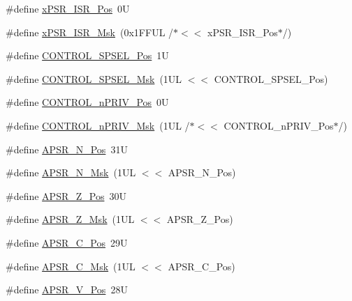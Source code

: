 \begin{DoxyCompactItemize}
\item 
\#define \mbox{\hyperlink{group___c_m_s_i_s___c_o_r_e_ga21bff245fb1aef9683f693d9d7bb2233}{x\+P\+S\+R\+\_\+\+I\+S\+R\+\_\+\+Pos}}~0U
\item 
\#define \mbox{\hyperlink{group___c_m_s_i_s___c_o_r_e_gadf8eed87e0081dfe1ef1c78a0ea91afd}{x\+P\+S\+R\+\_\+\+I\+S\+R\+\_\+\+Msk}}~(0x1\+F\+F\+U\+L /$\ast$$<$$<$ x\+P\+S\+R\+\_\+\+I\+S\+R\+\_\+\+Pos$\ast$/)
\item 
\#define \mbox{\hyperlink{group___c_m_s_i_s___c_o_r_e_ga07eafc53e609895342c6a530e9d01310}{C\+O\+N\+T\+R\+O\+L\+\_\+\+S\+P\+S\+E\+L\+\_\+\+Pos}}~1U
\item 
\#define \mbox{\hyperlink{group___c_m_s_i_s___c_o_r_e_ga70b29840969b06909da21369b0b05b53}{C\+O\+N\+T\+R\+O\+L\+\_\+\+S\+P\+S\+E\+L\+\_\+\+Msk}}~(1\+U\+L $<$$<$ C\+O\+N\+T\+R\+O\+L\+\_\+\+S\+P\+S\+E\+L\+\_\+\+Pos)
\item 
\#define \mbox{\hyperlink{group___c_m_s_i_s___c_o_r_e_ga51b95bc03ec0d815b459bde0b14a5908}{C\+O\+N\+T\+R\+O\+L\+\_\+n\+P\+R\+I\+V\+\_\+\+Pos}}~0U
\item 
\#define \mbox{\hyperlink{group___c_m_s_i_s___c_o_r_e_gaef3b20d77acb213338f89ce5e7bc36b0}{C\+O\+N\+T\+R\+O\+L\+\_\+n\+P\+R\+I\+V\+\_\+\+Msk}}~(1\+U\+L /$\ast$$<$$<$ C\+O\+N\+T\+R\+O\+L\+\_\+n\+P\+R\+I\+V\+\_\+\+Pos$\ast$/)
\item 
\#define \mbox{\hyperlink{group___c_m_s_i_s___c_o_r_e_gac469528d210043c7bd3f12f0e6824766}{A\+P\+S\+R\+\_\+\+N\+\_\+\+Pos}}~31U
\item 
\#define \mbox{\hyperlink{group___c_m_s_i_s___c_o_r_e_gadbc2cf55a026f661b53fadfcf822cef1}{A\+P\+S\+R\+\_\+\+N\+\_\+\+Msk}}~(1\+U\+L $<$$<$ A\+P\+S\+R\+\_\+\+N\+\_\+\+Pos)
\item 
\#define \mbox{\hyperlink{group___c_m_s_i_s___c_o_r_e_ga3661286d108b1aca308d7445685eae3a}{A\+P\+S\+R\+\_\+\+Z\+\_\+\+Pos}}~30U
\item 
\#define \mbox{\hyperlink{group___c_m_s_i_s___c_o_r_e_ga1deb4d1aa72bb83d1f79329406f15711}{A\+P\+S\+R\+\_\+\+Z\+\_\+\+Msk}}~(1\+U\+L $<$$<$ A\+P\+S\+R\+\_\+\+Z\+\_\+\+Pos)
\item 
\#define \mbox{\hyperlink{group___c_m_s_i_s___c_o_r_e_ga6cf72aa6f09a168f9e5beda1a4a887b9}{A\+P\+S\+R\+\_\+\+C\+\_\+\+Pos}}~29U
\item 
\#define \mbox{\hyperlink{group___c_m_s_i_s___c_o_r_e_ga6d47803fbad455bc10bd1ce59f2f335d}{A\+P\+S\+R\+\_\+\+C\+\_\+\+Msk}}~(1\+U\+L $<$$<$ A\+P\+S\+R\+\_\+\+C\+\_\+\+Pos)
\item 
\#define \mbox{\hyperlink{group___c_m_s_i_s___c_o_r_e_gac62830f67679ccd11658c4172c3e6ea7}{A\+P\+S\+R\+\_\+\+V\+\_\+\+Pos}}~28U

\end{DoxyCompactItemize}

